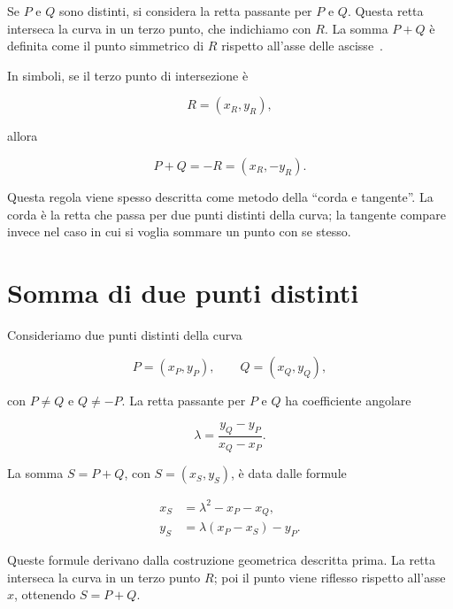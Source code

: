 \documentclass[12pt,a4paper,oneside]{report}
\begin{document}
Se \(P\) e \(Q\) sono distinti, si considera la retta passante per \(P\) e \(Q\). Questa retta interseca la curva in un terzo punto, che indichiamo con \(R\). La somma \(P+Q\) è definita come il punto simmetrico di \(R\) rispetto all'asse delle ascisse~\cite{margara_ec}.

In simboli, se il terzo punto di intersezione è

\[
R=(x_R,y_R),
\]

allora

\[
P+Q = -R = (x_R,-y_R).
\]

Questa regola viene spesso descritta come metodo della ``corda e tangente''. La corda è la retta che passa per due punti distinti della curva; la tangente compare invece nel caso in cui si voglia sommare un punto con se stesso.

\section{Somma di due punti distinti}

Consideriamo due punti distinti della curva

\[
P=(x_P,y_P), \qquad Q=(x_Q,y_Q),
\]

con \(P \neq Q\) e \(Q \neq -P\). La retta passante per \(P\) e \(Q\) ha coefficiente angolare

\begin{equation}
    \lambda = \frac{y_Q-y_P}{x_Q-x_P}.
    \label{eq:lambda-add-real}
\end{equation}

La somma \(S=P+Q\), con \(S=(x_S,y_S)\), è data dalle formule~\cite{margara_ec,sec1}

\begin{align}
    x_S &= \lambda^2 - x_P - x_Q, \label{eq:add-xs-real} \\
    y_S &= \lambda(x_P-x_S)-y_P. \label{eq:add-ys-real}
\end{align}

Queste formule derivano dalla costruzione geometrica descritta prima. La retta interseca la curva in un terzo punto \(R\); poi il punto viene riflesso rispetto all'asse \(x\), ottenendo \(S=P+Q\).
\end{document}

